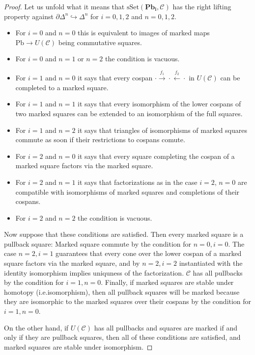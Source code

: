 \documentclass{article}
\begin{document}
\begin{proof}
  Let us unfold what it means that $\mathrm{sSet}(\mathbf{Pb_i}, \mathcal{C})$ has the right lifting property against $\partial \Delta^n \hookrightarrow \Delta^n$ for $i = 0, 1, 2$ and $n = 0, 1, 2$.
  \begin{itemize}
    \item
      For $i = 0$ and $n = 0$ this is equivalent to images of marked maps $\mathrm{Pb} \rightarrow U(\mathcal{C})$ being commutative squares.
    \item
      For $i = 0$ and $n = 1$ or $n = 2$ the condition is vacuous.
    \item
      For $i = 1$ and $n = 0$ it says that every cospan $\cdot \xrightarrow{f_1} \cdot \xleftarrow{f_2} \cdot$ in $U(\mathcal{C})$ can be completed to a marked square.
    \item
      For $i = 1$ and $n = 1$ it says that every isomorphism of the lower cospans of two marked squares can be extended to an isomorphism of the full squares.
    \item
      For $i = 1$ and $n = 2$ it says that triangles of isomorphisms of marked squares commute as soon if their restrictions to cospans comute.
    \item
      For $i = 2$ and $n = 0$ it says that every square completing the cospan of a marked square factors via the marked square.
    \item
      For $i = 2$ and $n = 1$ it says that factorizations as in the case $i = 2$, $n = 0$ are compatible with isomorphisms of marked squares and completions of their cospans.
    \item
      For $i = 2$ and $n = 2$ the condition is vacuous.
  \end{itemize}
  Now suppose that these conditions are satisfied.
  Then every marked square is a pullback square:
  Marked square commute by the condition for $n = 0, i = 0$.
  The case $n = 2, i = 1$ guarantees that every cone over the lower cospan of a marked square factors via the marked square, and by $n = 2, i = 2$ instantiated with the identity isomorphism implies uniquness of the factorization.
  $\mathcal{C}$ has all pullbacks by the condition for $i = 1, n = 0$.
  Finally, if marked squares are stable under homotopy (i.e.\@ isomorphism), then all pullback squares will be marked because they are isomorphic to the marked squares over their cospans by the condition for $i = 1, n = 0$.

  On the other hand, if $U(\mathcal{C})$ has all pullbacks and squares are marked if and only if they are pullback squares, then all of these conditions are satisfied, and marked squares are stable under isomorphism.
\end{proof}
\end{document}
